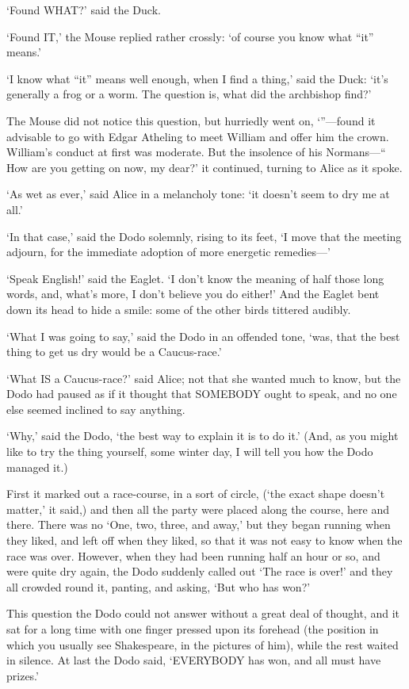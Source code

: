 \documentclass[12pt]{article}
\begin{document}
\begin{Parallel}[p]{}{}
{‘Found WHAT?’ said the Duck.

‘Found IT,’ the Mouse replied rather crossly: ‘of course you know what “it” means.’

‘I know what “it” means well enough, when I find a thing,’ said the Duck: ‘it’s generally a frog or a worm. The question is, what did the archbishop find?’

The Mouse did not notice this question, but hurriedly went on, ‘”—found it advisable to go with Edgar Atheling to meet William and offer him the crown. William’s conduct at first was moderate. But the insolence of his Normans—“ How are you getting on now, my dear?’ it continued, turning to Alice as it spoke.

‘As wet as ever,’ said Alice in a melancholy tone: ‘it doesn’t seem to dry me at all.’

‘In that case,’ said the Dodo solemnly, rising to its feet, ‘I move that the meeting adjourn, for the immediate adoption of more energetic remedies—’

‘Speak English!’ said the Eaglet. ‘I don’t know the meaning of half those long words, and, what’s more, I don’t believe you do either!’ And the Eaglet bent down its head to hide a smile: some of the other birds tittered audibly.

‘What I was going to say,’ said the Dodo in an offended tone, ‘was, that the best thing to get us dry would be a Caucus-race.’

‘What IS a Caucus-race?’ said Alice; not that she wanted much to know, but the Dodo had paused as if it thought that SOMEBODY ought to speak, and no one else seemed inclined to say anything.

‘Why,’ said the Dodo, ‘the best way to explain it is to do it.’ (And, as you might like to try the thing yourself, some winter day, I will tell you how the Dodo managed it.)

First it marked out a race-course, in a sort of circle, (‘the exact shape doesn’t matter,’ it said,) and then all the party were placed along the course, here and there. There was no ‘One, two, three, and away,’ but they began running when they liked, and left off when they liked, so that it was not easy to know when the race was over. However, when they had been running half an hour or so, and were quite dry again, the Dodo suddenly called out ‘The race is over!’ and they all crowded round it, panting, and asking, ‘But who has won?’

This question the Dodo could not answer without a great deal of thought, and it sat for a long time with one finger pressed upon its forehead (the position in which you usually see Shakespeare, in the pictures of him), while the rest waited in silence. At last the Dodo said, ‘EVERYBODY has won, and all must have prizes.’

}
\end{Parallel}
\end{document}

